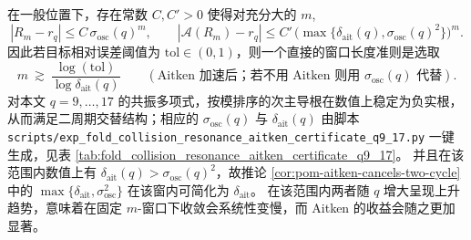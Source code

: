 \begin{remark}\label{rem:pom-aitken-window-audit}
在一般位置下，存在常数 \(C,C'>0\) 使得对充分大的 \(m\),
\[
\left|R_m-r_q\right|\le C\,\sigma_{\mathrm{osc}}(q)^{m},
\qquad
\left|\mathcal{A}(R_m)-r_q\right|\le C'\,\bigl(\max\{\delta_{\mathrm{ait}}(q),\sigma_{\mathrm{osc}}(q)^2\}\bigr)^{m}.
\]
因此若目标相对误差阈值为 \(\mathrm{tol}\in(0,1)\)，则一个直接的窗口长度准则是选取
\[
m\ \gtrsim\ \frac{\log(\mathrm{tol})}{\log \delta_{\mathrm{ait}}(q)}
\qquad(\text{Aitken 加速后；若不用 Aitken 则用 }\sigma_{\mathrm{osc}}(q)\text{ 代替}).
\]
对本文 \(q=9,\dots,17\) 的共振多项式，按模排序的次主导根在数值上稳定为负实根，从而满足二周期交替结构；相应的 \(\sigma_{\mathrm{osc}}(q)\) 与 \(\delta_{\mathrm{ait}}(q)\) 由脚本 \texttt{scripts/exp\_fold\_collision\_resonance\_aitken\_certificate\_q9\_17.py} 一键生成，见表 \ref{tab:fold_collision_resonance_aitken_certificate_q9_17}。
并且在该范围内数值上有 \(\delta_{\mathrm{ait}}(q)>\sigma_{\mathrm{osc}}(q)^2\)，故推论 \ref{cor:pom-aitken-cancels-two-cycle} 中的 \(\max\{\delta_{\mathrm{ait}},\sigma_{\mathrm{osc}}^2\}\) 在该窗内可简化为 \(\delta_{\mathrm{ait}}\)。
在该范围内两者随 \(q\) 增大呈现上升趋势，意味着在固定 \(m\)-窗口下收敛会系统性变慢，而 Aitken 的收益会随之更加显著。
\end{remark}



